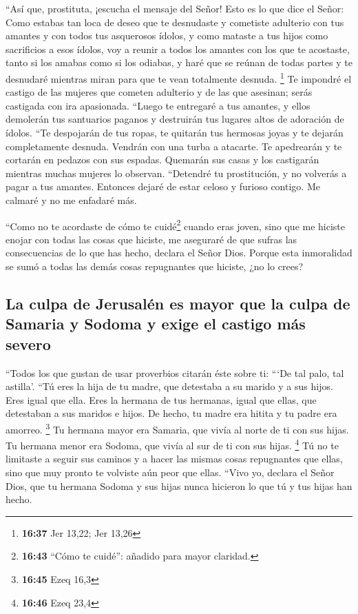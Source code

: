  ``Así que, prostituta, ¡escucha el mensaje del Señor!
 Esto es lo que dice el Señor: Como estabas tan loca de
deseo que te desnudaste y cometiste adulterio con tus amantes y con
todos tus asquerosos ídolos, y como mataste a tus hijos como sacrificios
a esos ídolos,  voy a reunir a todos los amantes con los
que te acostaste, tanto si los amabas como si los odiabas, y haré que se
reúnan de todas partes y te desnudaré mientras miran para que te vean
totalmente desnuda. \footnote{\textbf{16:37} Jer 13,22; Jer 13,26}
 Te impondré el castigo de las mujeres que cometen
adulterio y de las que asesinan; serás castigada con ira apasionada.
 ``Luego te entregaré a tus amantes, y ellos demolerán
tus santuarios paganos y destruirán tus lugares altos de adoración de
ídolos. ``Te despojarán de tus ropas, te quitarán tus hermosas joyas y
te dejarán completamente desnuda.  Vendrán con una turba
a atacarte. Te apedrearán y te cortarán en pedazos con sus espadas.
 Quemarán sus casas y los castigarán mientras muchas
mujeres lo observan. ``Detendré tu prostitución, y no volverás a pagar a
tus amantes.  Entonces dejaré de estar celoso y furioso
contigo. Me calmaré y no me enfadaré más.

 ``Como no te acordaste de cómo te cuidé\footnote{\textbf{16:43}
  ``Cómo te cuidé'': añadido para mayor claridad.} cuando eras joven,
sino que me hiciste enojar con todas las cosas que hiciste, me aseguraré
de que sufras las consecuencias de lo que has hecho, declara el Señor
Dios. Porque esta inmoralidad se sumó a todas las demás cosas
repugnantes que hiciste, ¿no lo crees?

\hypertarget{la-culpa-de-jerusaluxe9n-es-mayor-que-la-culpa-de-samaria-y-sodoma-y-exige-el-castigo-muxe1s-severo}{%
\subsection{La culpa de Jerusalén es mayor que la culpa de Samaria y
Sodoma y exige el castigo más
severo}\label{la-culpa-de-jerusaluxe9n-es-mayor-que-la-culpa-de-samaria-y-sodoma-y-exige-el-castigo-muxe1s-severo}}

 ``Todos los que gustan de usar proverbios citarán éste
sobre ti: ```De tal palo, tal astilla'.  ``Tú eres la
hija de tu madre, que detestaba a su marido y a sus hijos. Eres igual
que ella. Eres la hermana de tus hermanas, igual que ellas, que
detestaban a sus maridos e hijos. De hecho, tu madre era hitita y tu
padre era amorreo. \footnote{\textbf{16:45} Ezeq 16,3} 
Tu hermana mayor era Samaria, que vivía al norte de ti con sus hijas. Tu
hermana menor era Sodoma, que vivía al sur de ti con sus hijas.
\footnote{\textbf{16:46} Ezeq 23,4}  Tú no te limitaste a
seguir sus caminos y a hacer las mismas cosas repugnantes que ellas,
sino que muy pronto te volviste aún peor que ellas. 
``Vivo yo, declara el Señor Dios, que tu hermana Sodoma y sus hijas
nunca hicieron lo que tú y tus hijas han hecho.

